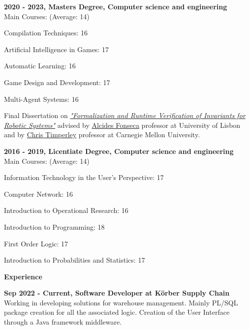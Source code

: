 \documentclass[a4paper,12pt,final]{memoir}
\newcommand{\Sep}{\vspace{1.5em}}
\newcommand{\SmallSep}{\vspace{0.5em}}
\newcommand{\CVSection}[1]
	{\Large\textbf{#1}\par
	\SmallSep\normalsize\normalfont}
\newcommand{\CVItem}[1]
	{\textbf{\color{RoyalBlue} #1}}
\begin{document}
\CVItem{2020 - 2023, Masters Degree, Computer science and engineering}\\
Main Courses: (Average: 14)
\begin{multicols}{2}
\begin{compactitem}[\color{RoyalBlue}$\circ$]
    \item Compilation Techniques: 16
	\item Artificial Intelligence in Games: 17
	\item Automatic Learning: 16
	\item Game Design and Development: 17
	\item Multi-Agent Systems: 16
\end{compactitem}
\end{multicols}
\SmallSep
Final Dissertation on \href{https://github.com/ricardocajo/thesis}{\textit{"Formalization and Runtime Verification of Invariants for Robotic
Systems"}} advised by \href{https://wiki.alcidesfonseca.com/about/}{Alcides Fonseca} professor at University of Lisbon and by \href{http://www.christimperley.co.uk/}{Chris Timperley} professor at Carnegie Mellon University.
\SmallSep

\CVItem{2016 - 2019, Licentiate Degree, Computer science and engineering}\\
Main Courses: (Average: 14)
\begin{multicols}{2}
\begin{compactitem}[\color{RoyalBlue}$\circ$]
    \item Information Technology in the User's Perspective: 17
	\item Computer Network: 16
	\item Introduction to Operational Research: 16
	\item Introduction to Programming: 18 
	\item First Order Logic: 17
	\item Introduction to Probabilities and Statistics: 17
\end{compactitem}
\end{multicols}
\SmallSep

\Sep

\CVSection{Experience}

\CVItem{Sep 2022 - Current, Software Developer at Körber Supply Chain}\\
Working in developing solutions for warehouse management. Mainly PL/SQL package creation for all the associated logic. Creation of the User Interface through a Java framework middleware.
\SmallSep
\end{document}
